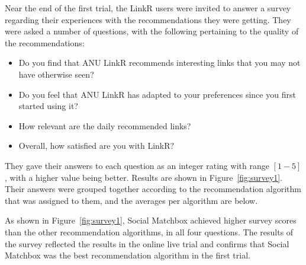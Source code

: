 Near the end of the first trial, the LinkR users were invited to answer a survey regarding their experiences with the recommendations they were getting. They were asked a number of questions, with the following pertaining to the quality of the recommendations:

\begin{itemize}
\item{Do you find that ANU LinkR recommends interesting links that you may not have otherwise seen?}
\item{Do you feel that ANU LinkR has adapted to your preferences since you first started using it?}
\item{How relevant are the daily recommended links?}
\item{Overall, how satisfied are you with LinkR?}
\end{itemize}

They gave their answers to each question as an integer rating with range $[1-5]$, with a higher value being better. Results are shown in Figure~\ref{fig:survey1}. Their answers were grouped together according to the recommendation algorithm that was assigned to them, and the averages per algorithm are below.

As shown in Figure~\ref{fig:survey1}, Social Matchbox achieved higher survey scores than the other recommendation algorithms, in all four questions. The results of the survey reflected the results in the online live trial and confirms that Social Matchbox was the best recommendation algorithm in the first trial.
 
